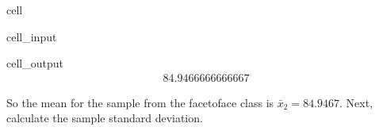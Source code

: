 \documentclass[letterpaper,10pt,english]{jupyterBook}
\begin{document}
\begin{sphinxuseclass}{cell}\begin{sphinxVerbatimInput}

\begin{sphinxuseclass}{cell_input}
\begin{sphinxVerbatim}[commandchars=\\\{\}]

\end{sphinxVerbatim}

\end{sphinxuseclass}\end{sphinxVerbatimInput}
\begin{sphinxVerbatimOutput}

\begin{sphinxuseclass}{cell_output}\begin{equation*}
\begin{split}84.9466666666667\end{split}
\end{equation*}
\end{sphinxuseclass}\end{sphinxVerbatimOutput}

\end{sphinxuseclass}
\sphinxAtStartPar
So the mean for the sample from the face\sphinxhyphen{}to\sphinxhyphen{}face class is \(\bar{x}_2 = 84.9467\). Next, calculate the sample standard deviation.
\end{document}
